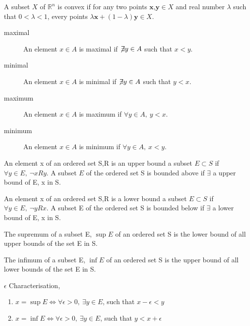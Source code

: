 	\begin{definition}
		A subset $X$ of $\mathbb{R}^n$ is convex if for any two points $\textbf{x,y} \in X$ and real number $\lambda$ such that $0 < \lambda < 1$, every points $\lambda \textbf{x} + (1-\lambda)\textbf{y} \in X$. 
	\end{definition}

	\begin{description}
		\item[maximal] An element $x \in A$ is maximal if $\not\!\exists y \in A$ such that $x<y$.
		\item[minimal] An element $x \in A$ is minimal if $\not\!\exists y \in A$ such that $y<x$.
		\item[maximum] An element $x \in A$ is maximum if $\forall y \in A,\ y<x$.
		\item[minimum] An element $x \in A$ is minimum if $\forall y \in A,\ x<y$.
	\end{description}

	\begin{definition}
		An element x of an ordered set S,R is an upper bound a subset $E \subset S$ if $\forall y \in E,\ \neg xRy$. A subset $E$ of the ordered set S is bounded above if $\exists$ a upper bound of E, x in S.
	\end{definition}

	\begin{definition}
		An element x of an ordered set S,R is a lower bound a subset $E \subset S$ if $\forall y \in E,\ \neg yRx$. A subset E of the ordered set S is bounded below if $\exists$ a lower bound of E, x in S.
	\end{definition}

	\begin{definition}
		The supremum of a subset E, $\sup E$ of an ordered set S is the lower bound of all upper bounds of the set E in S.
	\end{definition}

	\begin{definition}
		The infimum of a subset E, $\inf E$ of an ordered set S is the upper bound of all lower bounds of the set E in S.
	\end{definition}

	\begin{remark} $\epsilon$ Characterisation,
		\begin{enumerate}
			\item $ x = \sup E \iff \forall \epsilon > 0,\ \exists y \in E$, such that $x-\epsilon < y$
			\item $ x = \inf E \iff \forall \epsilon > 0,\ \exists y \in E$, such that $y < x+\epsilon$
		\end{enumerate}
	\end{remark}

